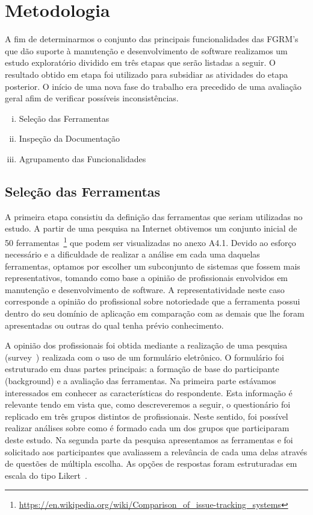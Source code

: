 \section{Metodologia}
\label{sec:metodologia}

A fim de determinarmos o conjunto das principais funcionalidades das FGRM's que
dão suporte à manutenção e desenvolvimento de software realizamos um estudo
exploratório dividido em três etapas que serão listadas a seguir. O resultado
obtido em etapa foi utilizado para subsidiar as atividades do etapa posterior.
O início de uma nova fase do trabalho era precedido de uma avaliação geral afim
de verificar possíveis inconsistências.

\begin{enumerate}[(i)]
	\item Seleção das Ferramentas
	\item Inspeção da Documentação
	\item Agrupamento das Funcionalidades
\end{enumerate}

\subsection{Seleção das Ferramentas}
\label{subsec:selecao-ferramentas}

A primeira etapa consistiu da definição das ferramentas que seriam utilizadas no
estudo. A partir de uma pesquisa na Internet obtivemos um conjunto inicial de 50
ferramentas~\footnote{\url{https://en.wikipedia.org/wiki/Comparison_of_issue-tracking_systems}}
que podem ser visualizadas no anexo A4.1. Devido ao esforço necessário e a
dificuldade de realizar a análise em cada uma daquelas ferramentas, optamos por
escolher um subconjunto de sistemas que fossem mais representativos, tomando
como base a opinião de profissionais envolvidos em manutenção e desenvolvimento
de software. A representatividade neste caso corresponde a opinião do
profissional sobre notoriedade que a ferramenta possui dentro do seu domínio de
aplicação em comparação com as demais que lhe foram apresentadas ou outras do
qual tenha prévio conhecimento.

A opinião dos profissionais foi obtida mediante a realização de uma pesquisa
(survey~\cite{wohlin2012experimentation}) realizada com o uso de um formulário
eletrônico. O formulário foi estruturado em duas partes principais: a formação
de base do participante (background) e a avaliação das ferramentas. Na primeira
parte estávamos interessados em conhecer as características do respondente. Esta
informação é relevante tendo em vista que, como descreveremos a seguir, o
questionário foi replicado em três grupos distintos de profissionais. Neste
sentido, foi possível realizar análises sobre como é formado cada um dos grupos
que participaram deste estudo. Na segunda parte da pesquisa apresentamos as
ferramentas e foi solicitado aos participantes que avaliassem a relevância de
cada uma delas através de questões de múltipla escolha. As opções de respostas
foram estruturadas em escala do tipo Likert~\cite{robbins2011plotting}.

